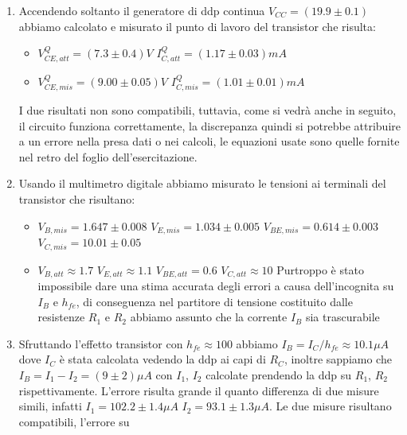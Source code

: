 \documentclass[10pt,a4paper]{article}
\begin{document}
\begin{enumerate}
\item Accendendo soltanto il generatore di ddp continua $V_{CC}=(19.9\pm0.1)$ abbiamo calcolato e misurato il punto di lavoro del transistor che risulta:
\begin{itemize}
\item $V_{CE,att}^Q = (7.3\pm0.4)V$ $I_{C,att}^Q = (1.17\pm0.03)mA$
\item $V_{CE,mis}^Q = (9.00\pm0.05)V$ $ I_{C,mis}^Q = (1.01\pm0.01)mA$
\end{itemize}
I due risultati non sono compatibili, tuttavia, come si vedrà anche in seguito, il circuito funziona correttamente, la discrepanza quindi si potrebbe attribuire a un errore nella presa dati o nei calcoli, le equazioni usate sono quelle fornite nel retro del foglio dell'esercitazione.

\item Usando il multimetro digitale abbiamo misurato le tensioni ai terminali del transistor che risultano:
\begin{itemize}
\item $V_{B,mis} = 1.647\pm0.008$ $V_{E,mis} = 1.034\pm 0.005$ $V_{BE,mis} = 0.614\pm0.003$ $V_{C,mis} = 10.01\pm0.05$
\item $V_{B,att} \approx 1.7$ $V_{E,att} \approx 1.1$ $V_{BE,att} = 0.6$ $V_{C,att} \approx 10$\newline
Purtroppo è stato impossibile dare una stima accurata degli errori a causa dell'incognita su $I_B$ e $h_{fe}$, di conseguenza nel partitore di tensione costituito dalle resistenze $R_1$ e $R_2$ abbiamo assunto che la corrente $I_B$ sia trascurabile
\end{itemize}
\item Sfruttando l'effetto transistor con $h_{fe}\approx 100$ abbiamo $I_B = I_C/h_{fe} \approx 10.1 \mu A$ dove $I_C$ è stata calcolata vedendo la ddp ai capi di $R_C$, inoltre sappiamo che $I_B = I_1-I_2 = (9\pm2)\mu A$ con $I_1$, $I_2$ calcolate prendendo la ddp su $R_1$, $R_2$ rispettivamente. L'errore risulta grande il quanto differenza di due misure simili, infatti $I_1=102.2\pm1.4\mu A$ $I_2=93.1\pm1.3\mu A$. Le due misure risultano compatibili, l'errore su 
\end{enumerate}
    
\end{document}
